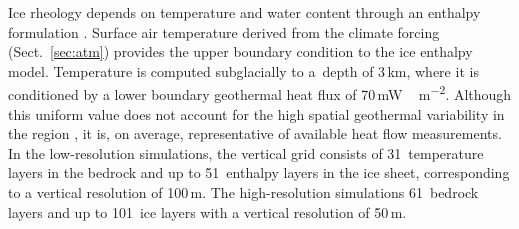 \documentclass[tc, manuscript]{copernicus}
\begin{document}
Ice rheology depends on temperature and water content through an enthalpy
formulation \citep{Aschwanden.etal.2012}. Surface air temperature derived from
the climate forcing (Sect.~\ref{sec:atm}) provides the upper boundary
condition to the ice enthalpy model. Temperature is computed subglacially to
a~depth of 3\,km,
where it is conditioned by a lower boundary geothermal heat flux of
70\,\unit{mW\,m^{-2}}. Although this uniform value does not account for the
high spatial geothermal variability in the region
\citep{Blackwell.Richards.2004}, it is, on average, representative of available
heat flow measurements. In the low-resolution simulations, the vertical grid
consists of 31~temperature layers in the bedrock and up to 51~enthalpy layers
in the ice sheet, corresponding to a vertical resolution of 100\,m. The
high-resolution simulations 61~bedrock layers and up to 101~ice layers with a
vertical resolution of 50\,m.
\end{document}
